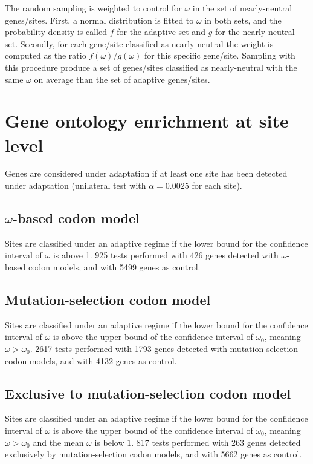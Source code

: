 \documentclass{article}
\begin{document}
The random sampling is weighted to control for $\omega$ in the set of nearly-neutral genes/sites.
First, a normal distribution is fitted to $\omega$ in both sets, and the probability density is called $f$ for the adaptive set and $g$ for the nearly-neutral set.
Secondly, for each gene/site classified as nearly-neutral the weight is computed as the ratio $f(\omega)/g(\omega)$ for this specific gene/site.
Sampling with this procedure produce a set of genes/sites classified as nearly-neutral with the same $\omega$ on average than the set of adaptive genes/sites.



\pagebreak
\section{Gene ontology enrichment at site level}
\label{sec:gene-ontology-enrichment}

Genes are considered under adaptation if at least one site has been detected under adaptation (unilateral test with $\alpha=0.0025$ for each site).

\subsection{$\omega$-based codon model}
\label{subsec:w-based-codon-method}
\normalfont
Sites are classified under an adaptive regime if the lower bound for the confidence interval of $\omega$ is above 1.
925 tests performed with 426 genes detected with $\omega$-based codon models, and with 5499 genes as control.


\subsection{Mutation-selection codon model}
\label{subsec:mutation-selection-codon-method}
\normalfont
Sites are classified under an adaptive regime if the lower bound for the confidence interval of $\omega$ is above the upper bound of the confidence interval of $\omega_{0}$, meaning $\omega > \omega_{0}$.
2617 tests performed with 1793 genes detected with mutation-selection codon models, and with 4132 genes as control.


\subsection{Exclusive to mutation-selection codon model}
\label{subsec:exclusive-to-mutation-selection-codon-method}
\normalsize

Sites are classified under an adaptive regime if the lower bound for the confidence interval of $\omega$ is above the upper bound of the confidence interval of $\omega_{0}$, meaning $\omega > \omega_{0}$ and the mean $\omega$ is below $1$.
817 tests performed with 263 genes detected exclusively by mutation-selection codon models, and with 5662 genes as control.


\printbibliography
\end{document}
